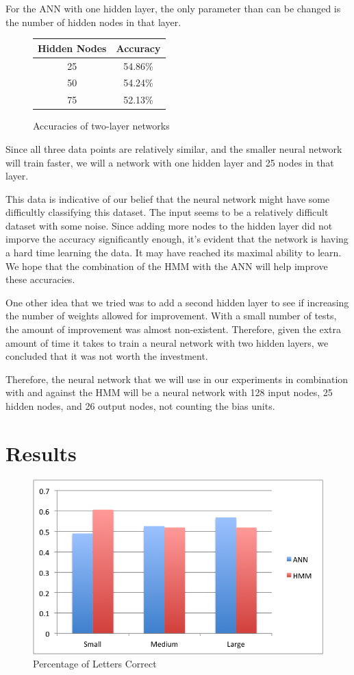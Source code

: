 \documentclass[11pt,a4paper,twocolumn]{article}
\begin{document}
For the ANN with one hidden layer, the only parameter than can be changed is the number of hidden nodes in that layer.
\begin{figure}[h]
\caption{Accuracies of two-layer networks}
\centering
\begin{tabular}{|c|c|}
\hline 
Hidden Nodes & Accuracy \\ 
\hline 
25 & 54.86\% \\ 
\hline 
50 & 54.24\% \\ 
\hline 
75 & 52.13\% \\ 
\hline 
\end{tabular} 
\end{figure}

Since all three data points are relatively similar, and the smaller neural network will train faster, we will a network with one hidden layer and 25 nodes in that layer.

This data is indicative of our belief that the neural network might have some difficultly classifying this dataset. The input seems to be a relatively difficult dataset with some noise. Since adding more nodes to the hidden layer did not imporve the accuracy significantly enough, it's evident that the network is having a hard time learning the data. It may have reached its maximal ability to learn. We hope that the combination of the HMM with the ANN will help improve these accuracies.

One other idea that we tried was to add a second hidden layer to see if increasing the number of weights allowed for improvement. With a small number of tests, the amount of improvement was almost non-existent. Therefore, given the extra amount of time it takes to train a neural network with two hidden layers, we concluded that it was not worth the investment.

Therefore, the neural network that we will use in our experiments in combination with and against the HMM will be a neural network with 128 input nodes, 25 hidden nodes, and 26 output nodes, not counting the bias units.


\section{Results}

\begin{figure}[h]
\centering
\caption{Percentage of Letters Correct}
\includegraphics[scale=0.55]{img/lettersCorrect.png}
\end{figure}
\end{document}
